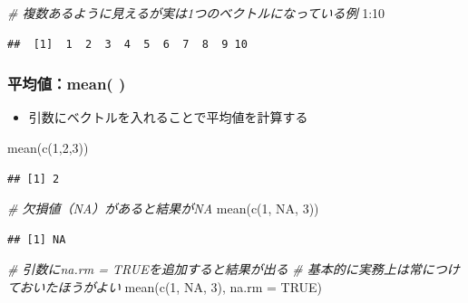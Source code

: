 \documentclass[
  xelatex,ja=standard, b5paper]{bxjsbook}
\newenvironment{Shaded}{\begin{snugshade}}{\end{snugshade}}
\newcommand{\AttributeTok}[1]{\textcolor[rgb]{0.77,0.63,0.00}{#1}}
\newcommand{\CommentTok}[1]{\textcolor[rgb]{0.56,0.35,0.01}{\textit{#1}}}
\newcommand{\ConstantTok}[1]{\textcolor[rgb]{0.00,0.00,0.00}{#1}}
\newcommand{\DecValTok}[1]{\textcolor[rgb]{0.00,0.00,0.81}{#1}}
\newcommand{\FunctionTok}[1]{\textcolor[rgb]{0.00,0.00,0.00}{#1}}
\newcommand{\NormalTok}[1]{#1}
\newcommand{\SpecialCharTok}[1]{\textcolor[rgb]{0.00,0.00,0.00}{#1}}
\providecommand{\tightlist}{%
  \setlength{\itemsep}{0pt}\setlength{\parskip}{0pt}}
\begin{document}
\begin{Shaded}
\begin{Highlighting}[]
\CommentTok{\# 複数あるように見えるが実は1つのベクトルになっている例}
\DecValTok{1}\SpecialCharTok{:}\DecValTok{10}
\end{Highlighting}
\end{Shaded}

\begin{verbatim}
##  [1]  1  2  3  4  5  6  7  8  9 10
\end{verbatim}

\hypertarget{p-function-ex-m}{%
\subsubsection{平均値：mean( )}\label{p-function-ex-m}}

\begin{itemize}
\tightlist
\item
  引数にベクトルを入れることで平均値を計算する
\end{itemize}

\begin{Shaded}
\begin{Highlighting}[]
\FunctionTok{mean}\NormalTok{(}\FunctionTok{c}\NormalTok{(}\DecValTok{1}\NormalTok{,}\DecValTok{2}\NormalTok{,}\DecValTok{3}\NormalTok{))}
\end{Highlighting}
\end{Shaded}

\begin{verbatim}
## [1] 2
\end{verbatim}

\begin{Shaded}
\begin{Highlighting}[]
\CommentTok{\# 欠損値（NA）があると結果がNA}
\FunctionTok{mean}\NormalTok{(}\FunctionTok{c}\NormalTok{(}\DecValTok{1}\NormalTok{, }\ConstantTok{NA}\NormalTok{, }\DecValTok{3}\NormalTok{))}
\end{Highlighting}
\end{Shaded}

\begin{verbatim}
## [1] NA
\end{verbatim}

\begin{Shaded}
\begin{Highlighting}[]
\CommentTok{\# 引数にna.rm = TRUEを追加すると結果が出る}
\CommentTok{\# 基本的に実務上は常につけておいたほうがよい}
\FunctionTok{mean}\NormalTok{(}\FunctionTok{c}\NormalTok{(}\DecValTok{1}\NormalTok{, }\ConstantTok{NA}\NormalTok{, }\DecValTok{3}\NormalTok{), }\AttributeTok{na.rm =} \ConstantTok{TRUE}\NormalTok{)}
\end{Highlighting}
\end{Shaded}
\end{document}
